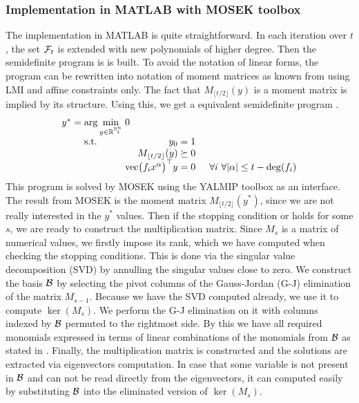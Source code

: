 \subsubsection{Implementation in MATLAB with MOSEK toolbox}
The implementation in MATLAB is quite straightforward.
In each iteration over $t$, the set $\mathcal{F}_t$ is extended with new polynomials of higher degree.
Then the semidefinite program is  is built.
To avoid the notation of linear forms, the program can be rewritten into notation of moment matrices as known from  using LMI and affine constraints only.
The fact that $M_{\lfloor t/2\rfloor}(y)$ is a moment matrix is implied by its structure.
Using this, we get a equivalent semidefinite program .
\begin{align}
  \arraycolsep=1.4pt
  \begin{array}{rclrcl@{\hskip0.5cm}l}
    y^* &=& \displaystyle \arg\min_{y\in\R^{\N^n_t}} & \multicolumn{3}{l}{0} \\
    && \text{s.t.} & y_0 &=& 1\\
    &&& M_{\lfloor t/2\rfloor}(y)&\succeq& 0\\
    &&& \vc\!\big(f_ix^\alpha\big)^\top y &=& 0 & \forall i\ \forall|\alpha| \leq t - \deg(f_i)
  \end{array}\labeleq{POP:sol:SDP_MM}
\end{align}
This program is solved by MOSEK \cite{mosek} using the YALMIP \cite{yalmip} toolbox as an interface.
The result from MOSEK is the moment matrix $M_{\lfloor t/2\rfloor}(y^*)$, since we are not really interested in the $y^*$ values.
Then if the stopping condition  or  holds for some $s$, we are ready to construct the multiplication matrix.
Since $M_s$ is a matrix of numerical values, we firstly impose its rank, which we have computed when checking the stopping conditions.
This is done via the singular value decomposition (SVD) by annulling the singular values close to zero.
We construct the basis $\mathcal{B}$ by selecting the pivot columns of the Gauss-Jordan (G-J) elimination of the matrix $M_{s-1}$.
Because we have the SVD computed already, we use it to compute $\ker(M_s)$.
We perform the G-J elimination on it with columns indexed by $\mathcal{B}$ permuted to the rightmost side.
By this we have all required monomials expressed in terms of linear combinations of the monomials from $\mathcal{B}$ as stated in .
Finally, the multiplication matrix is constructed and the solutions are extracted via eigenvectors computation.
In case that some variable is not present in $\mathcal{B}$ and can not be read directly from the eigenvectors, it can computed easily by substituting $\mathcal{B}$ into the eliminated version of $\ker(M_s)$.

